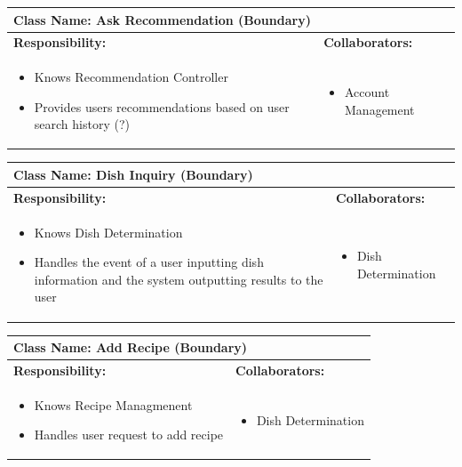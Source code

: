 \documentclass[]{article}
\begin{document}
\begin{table}[H]
	\centering
	\begin{tabular}{|p{7cm}|p{7cm}|}
	\hline 
	 \multicolumn{2}{|l|}{\textbf{Class Name:} Ask Recommendation (Boundary)} \\
	\hline
	\textbf{Responsibility:} & \textbf{Collaborators:} \\
	\hline
	\raggedright
	\begin{itemize}
		\item Knows Recommendation Controller
		\item Provides users recommendations based on user search history  (?)
	\end{itemize}
	\vspace{1in} & 
	\begin{itemize}
		\item Account Management
	\end{itemize} \\
	\hline
	\end{tabular}
\end{table}

\begin{table}[H]
	\centering
	\begin{tabular}{|p{7cm}|p{7cm}|}
	\hline 
	 \multicolumn{2}{|l|}{\textbf{Class Name:} Dish Inquiry (Boundary)} \\
	\hline
	\textbf{Responsibility:} & \textbf{Collaborators:} \\
	\hline
	\raggedright
	\begin{itemize}
		\item Knows Dish Determination
		\item Handles the event of a user inputting dish information and the system outputting results to the user
	\end{itemize}
	\vspace{1in} & 
	\begin{itemize}
		\item Dish Determination
	\end{itemize} \\
	\hline
	\end{tabular}
\end{table}

\begin{table}[H]
	\centering
	\begin{tabular}{|p{7cm}|p{7cm}|}
	\hline 
	 \multicolumn{2}{|l|}{\textbf{Class Name:} Add Recipe (Boundary)} \\
	\hline
	\textbf{Responsibility:} & \textbf{Collaborators:} \\
	\hline
	\raggedright
	\begin{itemize}
		\item Knows Recipe Managmenent
		\item Handles user request to add recipe
	\end{itemize}
	\vspace{1in} & 
	\begin{itemize}
		\item Dish Determination
	\end{itemize} \\
	\hline
	\end{tabular}
\end{table}
\end{document}
